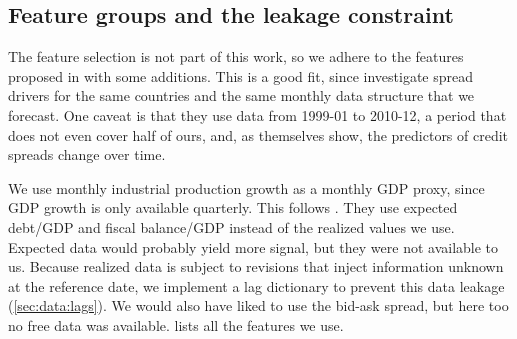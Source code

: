 \subsection{Feature groups and the leakage constraint}
\label{sec:data:features}

The feature selection is not part of this work, so we adhere to the features
proposed in \textcite[ECB WP 1781]{afonso2015} with some additions. This is a
good fit, since \textcite[ECB WP 1781]{afonso2015} investigate spread drivers
for the same countries and the same monthly data structure that we forecast.
One caveat is that they use data from 1999-01 to 2010-12, a period that does not
even cover half of ours, and, as \textcite[ECB WP 1781]{afonso2015} themselves
show, the predictors of credit spreads change over time.

We use monthly industrial production growth as a monthly GDP proxy, since GDP
growth is only available quarterly. This follows \textcite[ECB WP 1781]{afonso2015}.
They use expected debt/GDP and fiscal balance/GDP instead of the realized values
we use. Expected data would probably yield more signal, but they were not
available to us. Because realized data is subject to revisions that inject
information unknown at the reference date, we implement a lag dictionary to
prevent this data leakage (\cref{sec:data:lags}). We would also have liked to
use the bid-ask spread, but here too no free data was available.
 lists all the features we use.

